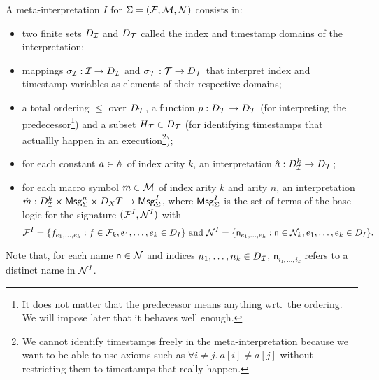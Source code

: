 \begin{definition}
  A meta-interpretation $I$ for $\Sigma = (\mathcal{F},\mathcal{M},\mathcal{N})$ consists in:
  \begin{itemize}
    \item two finite sets $D_{\mathcal{I}}$ and $D_{\mathcal{T}}$ called the index and timestamp
      domains of the interpretation;
    \item mappings $\sigma_{\mathcal{I}} : \mathcal{I} \to D_{\mathcal{I}}$
      and $\sigma_{\mathcal{T}} : \mathcal{T} \to D_{\mathcal{T}}$ that interpret index and
      timestamp variables as elements of their respective domains;
    \item a total ordering $\leq$ over $D_{\mathcal{T}}$,
      a function $p : D_{\mathcal{T}} \to D_{\mathcal{T}}$ (for interpreting the 
      predecessor\footnote{
        It does not matter that the predecessor means anything
        wrt.\ the ordering. We will impose later that it behaves
        well enough.
      })
      and a subset $H_{\mathcal{T}}\in D_{\mathcal{T}}$ (for identifying timestamps
      that actuallly happen in an execution\footnote{
        We cannot identify timestamps freely in the meta-interpretation
        because we want to be able to use axioms such as
        $\forall i\neq j.~ a[i] \neq a[j]$ without restricting
        them to timestamps that really happen.
      });
    \item for each constant $a \in \mathbb{A}$ of index arity $k$,
      an interpretation $\hat{a} : D_{\mathcal{I}}^k \to D_{\mathcal{T}}$;
    \item for each macro symbol $m \in \mathcal{M}$ of index
      arity $k$ and arity $n$, an interpretation
      $\hat{m} : D_{\mathcal{I}}^k \times \mathsf{Msg}_\Sigma^n \times D_XT \to \mathsf{Msg}^I_\Sigma$,
      where $\mathsf{Msg}^I_\Sigma$ is the set of terms of the base
      logic for the signature
      $(\mathcal{F}^I,\mathcal{N}^I)$ with
      $$ \mathcal{F}^I =
      \{ f_{e_1,\ldots,e_k} : f \in \mathcal{F}_k, e_1,\ldots,e_k \in D_I \}
      \text{ and }
      \mathcal{N}^I = \{ \mathsf{n}_{e_1,\ldots,e_k} : \mathsf{n}\in\mathcal{N}_k, 
      e_1,\ldots,e_k\in D_I \}.$$
  \end{itemize}
\end{definition}

Note that, for each name $\mathsf{n}\in \mathcal{N}$ and indices $n_1,\ldots,n_k \in 
D_{\mathcal{I}}$, $\mathsf{n}_{i_1,\ldots,i_k}$ refers to a distinct name in $\mathcal{N}^I$.

